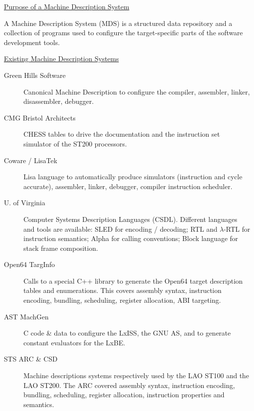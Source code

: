 \documentclass[a4]{seminar}
\begin{document}
\begin{slide}

\begin{center} \underline{Purpose of a Machine Description System}
\end{center}

A Machine Description System (MDS) is a structured data repository and a
collection of programs used to configure the target-specific parts of the
software development tools.

\begin{center} \underline{Existing Machine Description Systems}
\end{center}

\begin{description}

\item[Green Hills Software] Canonical Machine Description to configure the
compiler, assembler, linker, disassembler, debugger.

\item[CMG Bristol Architects] CHESS tables to drive the documentation and the
instruction set simulator of the ST200 processors.

\item[Coware / LisaTek] Lisa language to automatically produce
simulators (instruction and cycle accurate), assembler, linker, debugger,
compiler instruction scheduler.

\end{description}

\end{slide}


\begin{slide}

\begin{description}

\item[U. of Virginia] Computer Systems Description Languages (CSDL). Different
languages and tools are available: SLED for encoding / decoding; RTL and
$\lambda$-RTL for instruction semantics; Alpha for calling conventions; Block
language for stack frame composition.

\item[Open64 TargInfo] Calls to a special C++ library to generate the Open64
target description tables and enumerations. This covers assembly syntax,
instruction encoding, bundling, scheduling, register allocation, ABI targeting.

\item[AST MachGen] C code \& data to configure the LxISS, the GNU AS, and to
generate constant evaluators for the LxBE.

\item[STS ARC \& CSD] Machine descriptions systems respectively used by the LAO
ST100 and the LAO ST200. The ARC covered assembly syntax, instruction encoding,
bundling, scheduling, register allocation, instruction properties and semantics.

\end{description}

\end{slide}
\end{document}
